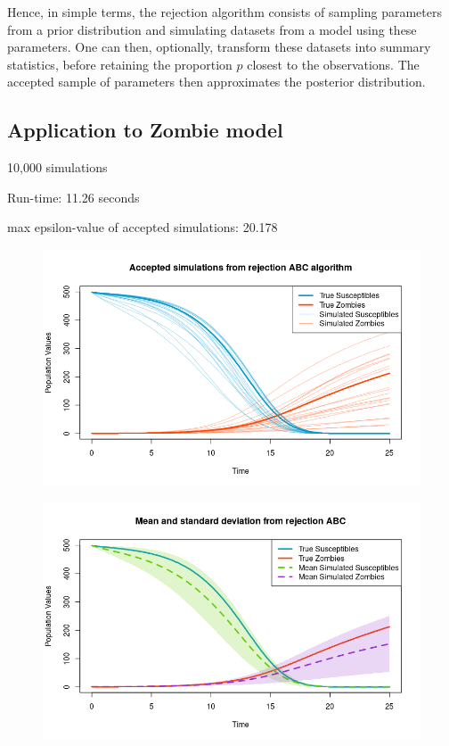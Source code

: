 \documentclass[]{article}
\begin{document}
\noindent Hence, in simple terms, the rejection algorithm consists of sampling parameters from a prior distribution and simulating datasets from a model using these parameters. One can then, optionally, transform these datasets into summary statistics, before retaining the proportion $p$ closest to the observations. The accepted sample of parameters then approximates the posterior distribution.

\subsection{Application to Zombie model}

10,000 simulations

Run-time: 11.26 seconds

max epsilon-value of accepted simulations: 20.178

\begin{figure}[H]
\centering
\includegraphics[width=0.8\linewidth]{../Figures/rej_ABC_simulations}
\end{figure}

\begin{figure}[H]
	\centering
	\includegraphics[width=0.8\linewidth]{../Figures/rej_abc_sd_bands}
\end{figure}
\end{document}
